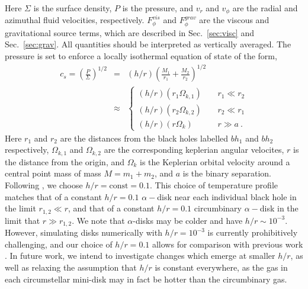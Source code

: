 \documentclass[apj]{emulateapj}
\begin{document}
Here $\Sigma$ is the surface density, $P$ is the pressure, and $v_r$ and $v_{\phi}$ are the radial and azimuthal fluid velocities, respectively. $F^{vis}_{\phi}$ and $F^{grav}_{\phi}$ are the viscous and gravitational source terms, which are described in Sec.~\ref{sec:visc} and Sec.~\ref{sec:grav}. All quantities should be interpreted as vertically averaged. The pressure is set to enforce a locally isothermal equation of state of the form, 
\begin{eqnarray}
  c_s = \left(
  \frac{P}{\Sigma}
\right)^{1/2} &=&   (h/r) 
\left(
  \frac{M_1}{r_1} + \frac{M_2}{r_2} 
\right)^{1/2}\nonumber\\
&\approx&  
\left\{ \begin{array}{cc}
    (h/r) (r_1 \Omega_{k,1}) \ \ \ \ \ & r_1 \ll r_2 \\
    (h/r) (r_2 \Omega_{k,2}) \ \ \ \ \ & r_2 \ll r_1\\
    (h/r) (r \Omega_{k}) \ \ \ \ \ \ & r \gg a \ .
  \end{array}
  \right.
\end{eqnarray}
 Here $r_1$ and $r_2$ are the distances from the black holes labelled $bh_1$ and $bh_2$ respectively, $\Omega_{k,1}$ and $\Omega_{k,2}$ are the corresponding keplerian angular velocites, $r$ is the distance from the origin, and $\Omega_k$ is the Keplerian orbital velocity around a central point mass of mass $M = m_1+m_2$, and $a$ is the binary separation. Following \citet{macfadyen08,dorazio13}, we choose $h/r = \mbox{const} = 0.1$. This choice of temperature profile matches that of a constant $h/r=0.1$ $\alpha-$disk near each individual black hole in the limit $r_{1,2} \ll r$, and that of a constant $h/r=0.1$ circumbinary $\alpha-$disk in the limit that $r \gg r_{1,2}$. We note that $\alpha$-disks may be colder and have $h/r \sim 10^{-3}$.
However, simulating disks numerically with $h/r=10^{-3}$ is currently prohibitively challenging, and our choice of $h/r=0.1$ allows for comparison with previous work \citep{artymowicz94,macfadyen08,dorazio13}. In future work, we intend to investigate changes which emerge at smaller $h/r$, as well as relaxing the assumption that $h/r$ is constant everywhere, as the gas in each circumstellar mini-disk may in fact be hotter than the circumbinary gas.
 
\end{document}
